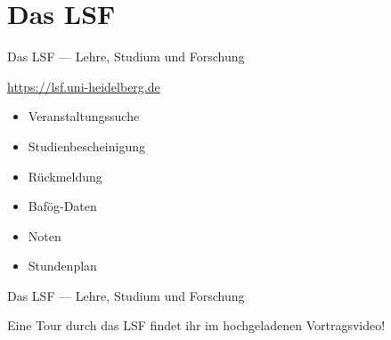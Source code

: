 \section{Das LSF}
\begin{frame}{Das LSF --- Lehre, Studium und Forschung}

    \large \url{https://lsf.uni-heidelberg.de} \\
    \begin{minipage}[t]{0.515\textwidth}
        \begin{itemize}
            \item{Veranstaltungssuche}
            \item{Studienbescheinigung}
            \item{Rückmeldung}
            \item{Bafög-Daten}
            \item{Noten}
            \item{Stundenplan}
        \end{itemize}
    \end{minipage}
    \begin{minipage}[t]{0.4\textwidth}
        \vspace{0.4cm}
        \begin{center}
        \end{center}
    \end{minipage}
\end{frame}

\begin{frame}{Das LSF --- Lehre, Studium und Forschung}
    \vspace{6em}
    \begin{center}
        \Large Eine Tour durch das LSF findet ihr im hochgeladenen Vortragsvideo!
    \end{center}
\end{frame}


